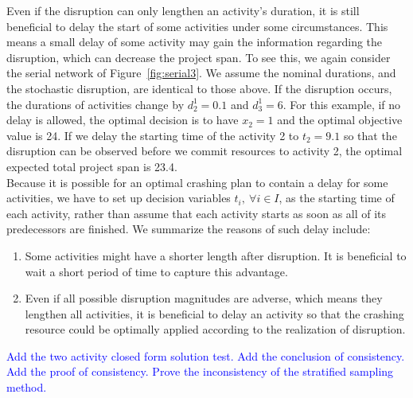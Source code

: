 \documentclass[11pt]{article}
\begin{document}
	\newline
	Even if the disruption can only lengthen an activity's duration, it is still beneficial to delay the start of some activities under some circumstances. This means a small delay of some activity may gain the information regarding the disruption, which can decrease the project span. To see this, we again consider the serial network of Figure~\ref{fig:serial3}. We assume the nominal durations, and the stochastic disruption, are identical to those above. If the disruption occurs, the durations of activities change by \(d_2^1=0.1\) and \(d_3^1 = 6\). For this example, if no delay is allowed, the optimal decision is to have \(x_2 = 1\) and the optimal objective value is 24. If we delay the starting time of the activity 2 to \(t_2 = 9.1\) so that the disruption can be observed before we commit resources to activity 2, the optimal expected total project span is 23.4. \\
	\newline
	Because it is possible for an optimal crashing plan to contain a delay for some activities, we have to set up decision variables \(t_i,\ \forall i \in I\), as the starting time of each activity, rather than assume that each activity starts as soon as all of its predecessors are finished.  We summarize the reasons of such delay include:
		\begin{enumerate}
			\item Some activities might have a shorter length after disruption. It is beneficial to wait a short period of time to capture this advantage.
			\item Even if all possible disruption magnitudes are adverse, which means they lengthen all activities, it is beneficial to delay an activity so that the crashing resource could be optimally applied according to the realization of disruption.
		\end{enumerate}
	\textcolor{blue}{Add the two activity closed form solution test. Add the conclusion of consistency. Add the proof of consistency. Prove the inconsistency of the stratified sampling method. }
\end{document}
